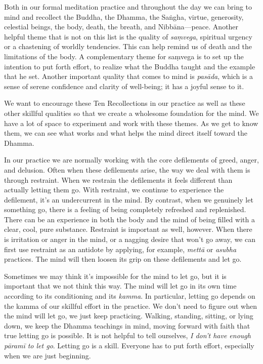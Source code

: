Both in our formal meditation practice and throughout the day we can 
bring to mind and recollect the Buddha, the Dhamma, the Saṅgha, 
virtue, generosity, celestial beings, the body, death, the breath, and 
Nibbāna---peace. Another helpful theme that is not on this list is the 
quality of \emph{saṃvega}, spiritual urgency or a chastening of 
worldly tendencies. This can help remind us of death and the 
limitations of the body. A complementary theme for saṃvega is to set 
up the intention to put forth effort, to realize what the Buddha taught 
and the example that he set. Another important quality that comes to 
mind is \emph{pasāda}, which is a sense of serene confidence and 
clarity of well-being; it has a joyful sense to it.

We want to encourage these Ten Recollections in our practice as well as 
these other skillful qualities so that we create a wholesome foundation 
for the mind. We have a lot of space to experiment and work with these 
themes. As we get to know them, we can see what works and what helps 
the mind direct itself toward the Dhamma.


In our practice we are normally working with the core defilements of 
greed, anger, and delusion. Often when these defilements arise, the way 
we deal with them is through restraint. When we restrain the 
defilements it feels different than actually letting them go. With 
restraint, we continue to experience the defilement, it's an 
undercurrent in the mind. By contrast, when we genuinely let something 
go, there is a feeling of being completely refreshed and replenished. 
There can be an experience in both the body and the mind of being 
filled with a clear, cool, pure substance. Restraint is important as 
well, however. When there is irritation or anger in the mind, or a 
nagging desire that won't go away, we can first use restraint as an 
antidote by applying, for example, \emph{mettā} or \emph{asubha} 
practices. The mind will then loosen its grip on these defilements and 
let go.

Sometimes we may think it's impossible for the mind to let go, but it 
is important that we not think this way. The mind will let go in its 
own time according to its conditioning and its \emph{kamma}. In 
particular, letting go depends on the kamma of our skillful effort in 
the practice. We don't need to figure out when the mind will let go, we 
just keep practicing. Walking, standing, sitting, or lying down, we 
keep the Dhamma teachings in mind, moving forward with faith that true 
letting go is possible. It is not helpful to tell ourselves, \emph{I 
don't have enough pāramī to let go}. Letting go is a skill. Everyone 
has to put forth effort, especially when we are just beginning.

